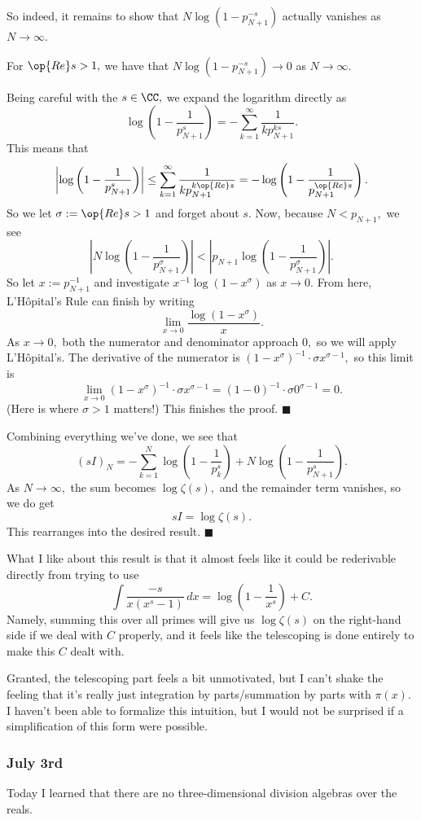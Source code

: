 So indeed, it remains to show that $N\log\left(1-p_{N+1}^{-s}\right)$ actually vanishes as $N\to\infty.$
\begin{lemma}
    For $\op{Re}s>1,$ we have that $N\log\left(1-p_{N+1}^{-s}\right)\to0$ as $N\to\infty.$
\end{lemma}
Being careful with the $s\in\CC,$ we expand the logarithm directly as
\[\log\left(1-\frac1{p_{N+1}^s}\right)=-\sum_{k=1}^\infty\frac1{kp_{N+1}^{ks}}.\]
This means that
\[\left|\log\left(1-\frac1{p_{N+1}^s}\right)\right|\le\sum_{k=1}^\infty\frac1{kp_{N+1}^{k\op{Re}s}}=-\log\left(1-\frac1{p_{N+1}^{\op{Re}s}}\right).\]
So we let $\sigma:=\op{Re}s>1$ and forget about $s.$ Now, because $N<p_{N+1},$ we see
\[\left|N\log\left(1-\frac1{p_{N+1}^\sigma}\right)\right|<\left|p_{N+1}\log\left(1-\frac1{p_{N+1}^\sigma}\right)\right|.\]
So let $x:=p_{N+1}^{-1}$ and investigate $x^{-1}\log\left(1-x^\sigma\right)$ as $x\to0.$ From here, L'H\^opital's Rule can finish by writing
\[\lim_{x\to 0}\frac{\log\left(1-x^\sigma\right)}x.\]
As $x\to0,$ both the numerator and denominator approach $0,$ so we will apply L'H\^opital's. The derivative of the numerator is $\left(1-x^\sigma\right)^{-1}\cdot\sigma x^{\sigma-1},$ so this limit is
\[\lim_{x\to0}\left(1-x^\sigma\right)^{-1}\cdot\sigma x^{\sigma-1}=(1-0)^{-1}\cdot\sigma0^{\sigma-1}=0.\]
(Here is where $\sigma>1$ matters!) This finishes the proof. $\blacksquare$

Combining everything we've done, we see that
\[(sI)_N=-\sum_{k=1}^N\log\left(1-\frac1{p_k^s}\right)+N\log\left(1-\frac1{p_{N+1}^s}\right).\]
As $N\to\infty,$ the sum becomes $\log\zeta(s),$ and the remainder term vanishes, so we do get
\[sI=\log\zeta(s).\]
This rearranges into the desired result. $\blacksquare$

What I like about this result is that it almost feels like it could be rederivable directly from trying to use
\[\int\frac{-s}{x\left(x^s-1\right)}\,dx=\log\left(1-\frac1{x^s}\right)+C.\]
Namely, summing this over all primes will give us $\log\zeta(s)$ on the right-hand side if we deal with $C$ properly, and it feels like the telescoping is done entirely to make this $C$ dealt with.

Granted, the telescoping part feels a bit unmotivated, but I can't shake the feeling that it's really just integration by parts/summation by parts with $\pi(x).$ I haven't been able to formalize this intuition, but I would not be surprised if a simplification of this form were possible.

\subsubsection{July 3rd}
Today I learned that there are no three-dimensional division algebras over the reals. \todo{}
